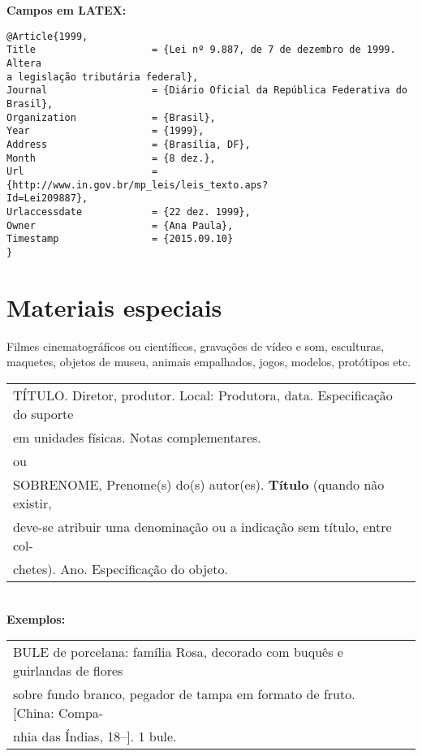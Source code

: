 \textbf{Campos em LATEX:} 

\begin{verbatim}
@Article{1999,
Title                    = {Lei nº 9.887, de 7 de dezembro de 1999. Altera 
a legislação tributária federal},
Journal                  = {Diário Oficial da República Federativa do 
Brasil},
Organization             = {Brasil},
Year                     = {1999},
Address                  = {Brasília, DF},
Month                    = {8 dez.},
Url                      = {http://www.in.gov.br/mp_leis/leis_texto.aps?
Id=Lei209887},
Urlaccessdate            = {22 dez. 1999},
Owner                    = {Ana Paula},
Timestamp                = {2015.09.10}
}
\end{verbatim}

\section{Materiais especiais}

Filmes cinematográficos ou científicos, gravações de vídeo e som,
esculturas, maquetes, objetos de museu, animais empalhados, jogos,
modelos, protótipos etc. \\

\begin{tabular}{|l|c|} \hline
	TÍTULO. Diretor, produtor. Local: Produtora, data. Especificação do	suporte\\
	em unidades físicas. Notas complementares. \\
	
	ou\\	
	
	SOBRENOME, Prenome(s) do(s) autor(es). \textbf{Título} (quando não 	existir,\\
	deve-se atribuir uma denominação ou a indicação sem 	título, entre col-\\
	chetes). Ano. Especificação do objeto. 
	\\\hline
\end{tabular} \\

\textbf{Exemplos:} \\

\begin{tabular}{|l|c|} \hline
BULE de porcelana: família Rosa, decorado com buquês e guirlandas de flores\\ 
sobre fundo branco, pegador de tampa em formato de fruto. [China: Compa-\\
nhia das Índias, 18--]. 1 bule.  
	\\\hline
\end{tabular} \\

